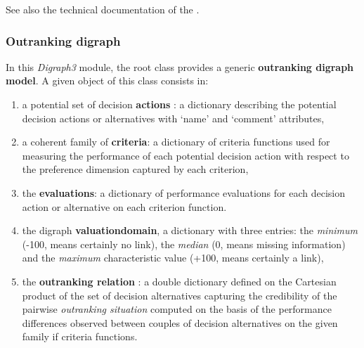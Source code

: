 \documentclass[letterpaper,10pt,english]{sphinxmanual}
\begin{document}
See also the technical documentation of the {\hyperref[techDoc:outrankingdigraphs-label]{\emph{}}}.


\subsubsection{Outranking digraph}
\label{tutorial:outranking-digraph}
In this \emph{Digraph3} module, the root {\hyperref[techDoc:outrankingDigraphs.OutrankingDigraph]{\emph{}}} class provides a generic \textbf{outranking digraph model}. A given object of this class consists in:
\begin{enumerate}
\item {} 
a potential set of decision \textbf{actions} : a dictionary describing the potential decision actions or alternatives with `name' and `comment' attributes,

\item {} 
a coherent family of \textbf{criteria}: a dictionary of criteria functions used for measuring the performance of each potential decision action with respect to the preference dimension captured by each criterion,

\item {} 
the \textbf{evaluations}: a dictionary of performance evaluations for each decision action or alternative on each criterion function.

\item {} 
the digraph \textbf{valuationdomain}, a dictionary with three entries: the \emph{minimum} (-100, means certainly no link), the \emph{median} (0, means missing information) and the \emph{maximum} characteristic value (+100, means certainly a link),

\item {} 
the \textbf{outranking relation} : a double dictionary defined on the Cartesian product of the set of decision alternatives capturing the credibility of the pairwise \emph{outranking situation} computed on the basis of the performance differences observed between couples of decision alternatives on the given family if criteria functions.

\end{enumerate}
\end{document}
